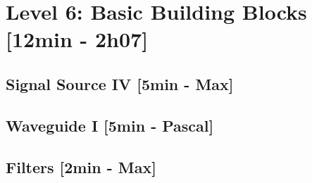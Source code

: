 
\section{Level 6: Basic Building Blocks [12min - 2h07]}
\subsection{Signal Source IV [5min - Max]}


\subsection{Waveguide I [5min - Pascal]}


\subsection{Filters [2min - Max]}





